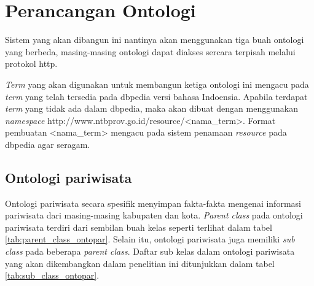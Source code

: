 \section{Perancangan Ontologi}
Sistem yang akan dibangun ini nantinya akan menggunakan tiga buah ontologi yang berbeda, masing-masing ontologi dapat diakses sercara terpisah melalui protokol http.

\emph{Term} yang akan digunakan untuk membangun ketiga ontologi ini mengacu pada \emph{term} yang telah tersedia pada dbpedia versi bahasa Indoensia. Apabila terdapat \emph{term} yang tidak ada dalam dbpedia, maka akan dibuat dengan menggunakan \emph{namespace} http://www.ntbprov.go.id/resource/<nama\_term>. Format pembuatan <nama\_term> mengacu pada sistem penamaan \emph{resource} pada dbpedia agar seragam.

\subsection{Ontologi pariwisata}
Ontologi pariwisata secara spesifik menyimpan fakta-fakta mengenai informasi pariwisata dari masing-masing kabupaten dan kota. \emph{Parent class} pada ontologi pariwisata terdiri dari sembilan buah kelas seperti terlihat dalam tabel \ref{tab:parent_class_ontopar}. Selain itu, ontologi pariwisata juga memiliki \emph{sub class} pada beberapa \emph{parent class}. Daftar sub kelas dalam ontologi pariwisata yang akan dikembangkan dalam penelitian ini ditunjukkan dalam tabel \ref{tab:sub_class_ontopar}.


